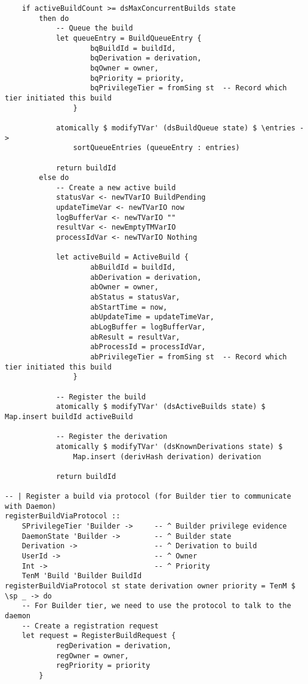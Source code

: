 \documentclass{article}
\begin{document}
\begin{tcolorbox}[title=Ten/Daemon/State.hs Changes]
\begin{verbatim}
    if activeBuildCount >= dsMaxConcurrentBuilds state
        then do
            -- Queue the build
            let queueEntry = BuildQueueEntry {
                    bqBuildId = buildId,
                    bqDerivation = derivation,
                    bqOwner = owner,
                    bqPriority = priority,
                    bqPrivilegeTier = fromSing st  -- Record which tier initiated this build
                }

            atomically $ modifyTVar' (dsBuildQueue state) $ \entries ->
                sortQueueEntries (queueEntry : entries)

            return buildId
        else do
            -- Create a new active build
            statusVar <- newTVarIO BuildPending
            updateTimeVar <- newTVarIO now
            logBufferVar <- newTVarIO ""
            resultVar <- newEmptyTMVarIO
            processIdVar <- newTVarIO Nothing

            let activeBuild = ActiveBuild {
                    abBuildId = buildId,
                    abDerivation = derivation,
                    abOwner = owner,
                    abStatus = statusVar,
                    abStartTime = now,
                    abUpdateTime = updateTimeVar,
                    abLogBuffer = logBufferVar,
                    abResult = resultVar,
                    abProcessId = processIdVar,
                    abPrivilegeTier = fromSing st  -- Record which tier initiated this build
                }

            -- Register the build
            atomically $ modifyTVar' (dsActiveBuilds state) $ Map.insert buildId activeBuild

            -- Register the derivation
            atomically $ modifyTVar' (dsKnownDerivations state) $
                Map.insert (derivHash derivation) derivation

            return buildId

-- | Register a build via protocol (for Builder tier to communicate with Daemon)
registerBuildViaProtocol ::
    SPrivilegeTier 'Builder ->     -- ^ Builder privilege evidence
    DaemonState 'Builder ->        -- ^ Builder state
    Derivation ->                  -- ^ Derivation to build
    UserId ->                      -- ^ Owner
    Int ->                         -- ^ Priority
    TenM 'Build 'Builder BuildId
registerBuildViaProtocol st state derivation owner priority = TenM $ \sp _ -> do
    -- For Builder tier, we need to use the protocol to talk to the daemon
    -- Create a registration request
    let request = RegisterBuildRequest {
            regDerivation = derivation,
            regOwner = owner,
            regPriority = priority
        }


\end{verbatim}
\end{tcolorbox}
\end{document}
